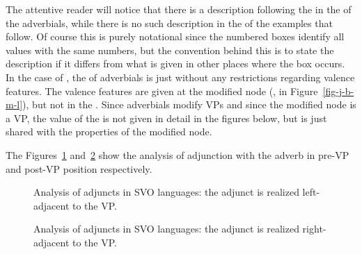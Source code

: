 The attentive reader will notice that there is a description following the  in the \modv of
the adverbials, while there is no such description in the \modvs of the  examples that
follow. Of course this is purely notational since the numbered boxes identify all values with the
same numbers, but the convention behind this is to state the description if it differs from what is
given in other places where the box occurs. In the case of , the \modv of adverbials is just
 without any restrictions regarding valence features. The valence features are given at
the modified node (\eg \spr \eliste, \comps {} in
Figure~\ref{fig-j-b-m-l}), but not in the \modv. Since  adverbials modify VPs and since the
modified node is a VP, the value of the \modv is not given in detail in the figures below, but is just shared with the
properties of the modified node.


The Figures~\ref{fig-adj-vp} and~\ref{fig-vp-adj} show the analysis of adjunction with the adverb in
pre-VP and post-VP position respectively.
\begin{figure}
\caption{\label{fig-adj-vp}Analysis of adjuncts in SVO languages: the adjunct is realized left-adjacent to the VP.}
\end{figure}
\begin{figure}
\caption{\label{fig-vp-adj}Analysis of adjuncts in SVO languages: the adjunct is realized right-adjacent to the VP.}
\end{figure}


